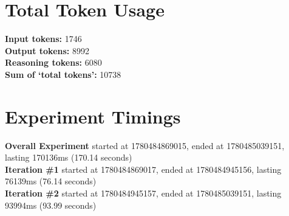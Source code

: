 \documentclass{article}
\begin{document}
\section*{Total Token Usage}
\textbf{Input tokens: }1746
\\\textbf{Output tokens: }8992
\\\textbf{Reasoning tokens: }6080
\\\textbf{Sum of `total tokens': }10738
\section*{Experiment Timings}
\textbf{Overall Experiment} started at 1780484869015, ended at 1780485039151, lasting 170136ms (170.14 seconds)
\\\textbf{Iteration \#1} started at 1780484869017, ended at 1780484945156, lasting 76139ms (76.14 seconds)
\\\textbf{Iteration \#2} started at 1780484945157, ended at 1780485039151, lasting 93994ms (93.99 seconds)
\end{document}
